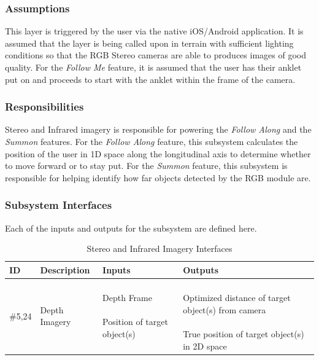 \subsubsection{Assumptions}
This layer is triggered by the user via the native iOS/Android application. It is assumed that the layer is being called upon in terrain with sufficient lighting conditions so that the RGB Stereo cameras are able to produces images of good quality. For the \textit{Follow Me} feature, it is assumed that the user has their anklet put on and proceeds to start with the anklet within the frame of the camera. 

\subsubsection{Responsibilities}
Stereo and Infrared imagery is responsible for powering the \textit{Follow Along} and the \textit{Summon} features. For the \textit{Follow Along} feature, this subsystem calculates the position of the user in 1D space along the longitudinal axis to determine whether to move forward or to stay put. For the \textit{Summon} feature, this subsystem is responsible for helping identify how far objects detected by the RGB module are. 

\subsubsection{Subsystem Interfaces}
Each of the inputs and outputs for the subsystem are defined here.

\begin {table}[H]
\caption {Stereo and Infrared Imagery Interfaces} 
\begin{center}
    \begin{tabular}{ | p{1cm} | p{6cm} | p{3cm} | p{3cm} |}
    \hline
    ID & Description & Inputs & Outputs \\ \hline
    \#5,24 & Depth Imagery & \pbox{3cm}{Depth Frame \\ \\ Position of target object(s)} & \pbox{3cm}{\phantom{Boo!}\\ Optimized distance of target object(s) from camera\\ \\True position of target object(s) in 2D space\\}  \\ \hline
    \end{tabular}
\end{center}
\end{table}
